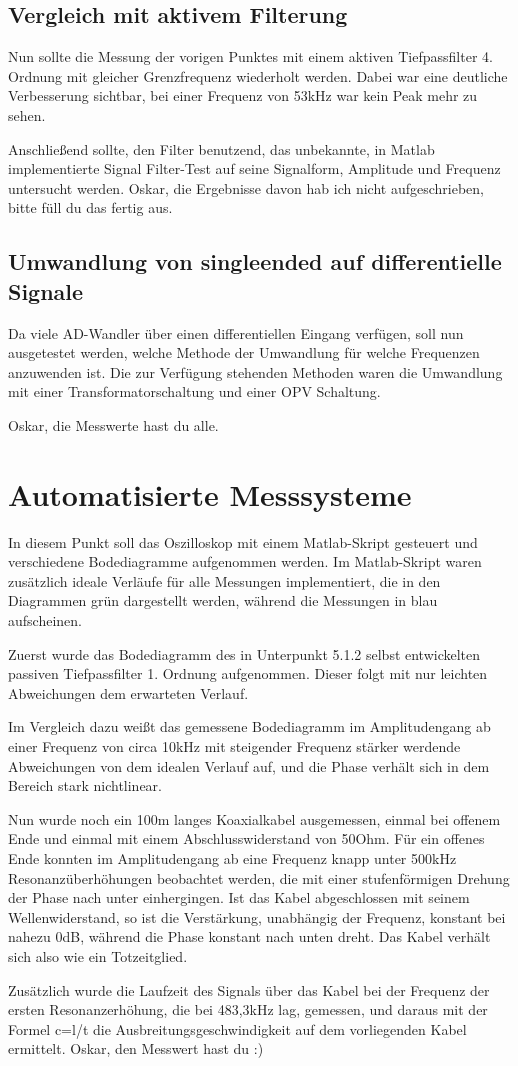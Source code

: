 \subsection{Vergleich mit aktivem Filterung}

Nun sollte die Messung der vorigen Punktes mit einem aktiven Tiefpassfilter 4. Ordnung mit gleicher Grenzfrequenz wiederholt werden. Dabei war eine deutliche Verbesserung sichtbar, bei einer Frequenz von 53kHz war kein Peak mehr zu sehen.

Anschließend sollte, den Filter benutzend, das unbekannte, in Matlab implementierte Signal Filter-Test auf seine Signalform, Amplitude und Frequenz untersucht werden. Oskar, die Ergebnisse davon hab ich nicht aufgeschrieben, bitte füll du das fertig aus.

\subsection{Umwandlung von singleended auf differentielle Signale}

Da viele AD-Wandler über einen differentiellen Eingang verfügen, soll nun ausgetestet werden, welche Methode der Umwandlung für welche Frequenzen anzuwenden ist. Die zur Verfügung stehenden Methoden waren die Umwandlung mit einer Transformatorschaltung und einer OPV Schaltung.

Oskar, die Messwerte hast du alle.
\section{Automatisierte Messsysteme}

In diesem Punkt soll das Oszilloskop mit einem Matlab-Skript gesteuert und verschiedene Bodediagramme aufgenommen werden. Im Matlab-Skript waren zusätzlich ideale Verläufe für alle Messungen implementiert, die in den Diagrammen grün dargestellt werden, während die Messungen in blau aufscheinen.

Zuerst wurde das Bodediagramm des in Unterpunkt 5.1.2 selbst entwickelten passiven Tiefpassfilter 1. Ordnung aufgenommen. Dieser folgt mit nur leichten Abweichungen dem erwarteten Verlauf.

Im Vergleich dazu weißt das gemessene Bodediagramm im Amplitudengang ab einer Frequenz von circa 10kHz mit steigender Frequenz stärker werdende Abweichungen von dem idealen Verlauf auf, und die Phase verhält sich in dem Bereich stark nichtlinear.

Nun wurde noch ein 100m langes Koaxialkabel ausgemessen, einmal bei offenem Ende und einmal mit einem Abschlusswiderstand von 50Ohm. Für ein offenes Ende konnten im Amplitudengang ab eine Frequenz knapp unter 500kHz Resonanzüberhöhungen beobachtet werden, die mit einer stufenförmigen Drehung der Phase nach unter einhergingen. Ist das Kabel abgeschlossen mit seinem Wellenwiderstand, so ist die Verstärkung, unabhängig der Frequenz, konstant bei nahezu 0dB, während die Phase konstant nach unten dreht. Das Kabel verhält sich also wie ein Totzeitglied.

Zusätzlich wurde die Laufzeit des Signals über das Kabel bei der Frequenz der ersten Resonanzerhöhung, die bei 483,3kHz lag, gemessen, und daraus mit der Formel c=l/t die Ausbreitungsgeschwindigkeit auf dem vorliegenden Kabel ermittelt.
Oskar, den Messwert hast du :)